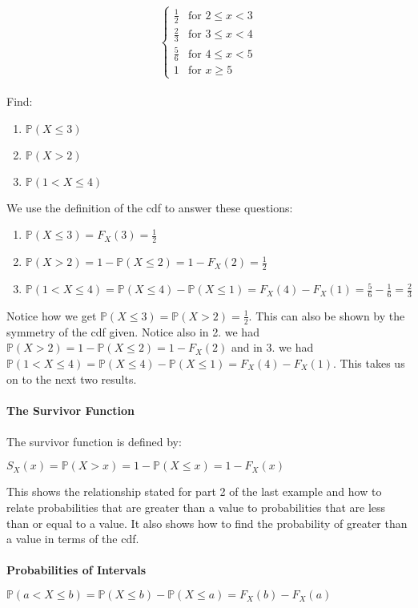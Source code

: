 \documentclass[,oneside]{article}
\begin{document}
\begin{enumerate}
\[\begin{cases}
\frac{1}{2} & \text{for } 2 \leq x < 3 \\
\frac{2}{3} & \text{for } 3 \leq x < 4 \\
\frac{5}{6} & \text{for } 4 \leq x < 5 \\
1 & \text{for } x \geq 5
\end{cases} \]
\\
Find:
\begin{enumerate}
\item $\mathbb{P}(X \leq 3)$
\item $\mathbb{P}(X > 2)$
\item $\mathbb{P}(1 < X \leq 4)$
\end{enumerate}
We use the definition of the cdf to answer these questions:\\
\begin{enumerate}
\item $\mathbb{P}(X \leq 3) = F_X(3) = \frac{1}{2}$
\item $\mathbb{P}(X > 2) =1-\mathbb{P}(X \leq 2)=1-F_X(2) = \frac{1}{2}$
\item $\mathbb{P}(1 < X \leq 4) = \mathbb{P}(X \leq 4)-\mathbb{P}(X \leq 1) =F_X(4)-F_X(1)=\frac{5}{6}-\frac{1}{6}=\frac{2}{3}$\\
\end{enumerate}
Notice how we get $\mathbb{P}(X \leq 3) = \mathbb{P}(X > 2) = \frac{1}{2}$. This can also be shown by the symmetry of the cdf given. Notice also in 2. we had $\mathbb{P}(X > 2) =1-\mathbb{P}(X \leq 2)=1-F_X(2)$ and in 3. we had $\mathbb{P}(1 < X \leq 4) = \mathbb{P}(X \leq 4)-\mathbb{P}(X \leq 1) =F_X(4)-F_X(1)$. This takes us on to the next two results.\\
\\ \textbf{The Survivor Function}\\ 
\\The survivor function is defined by:
\begin{center}
$S_X(x) = \mathbb{P}(X  > x) = 1-\mathbb{P}(X \leq x) = 1-F_X(x)$
\end{center}
This shows the relationship stated for part 2 of the last example and how to relate probabilities that are greater than a value to probabilities that are less than or equal to a value. It also shows how to find the probability of greater than a value in terms of the cdf.\\ \\
\textbf{Probabilities of Intervals}
\\
\begin{center}
$\mathbb{P}(a  < X \leq b) = \mathbb{P}(X \leq b)-\mathbb{P}(X \leq a) = F_X(b)-F_X(a)$

\end{center}
\end{enumerate}
\end{document}
